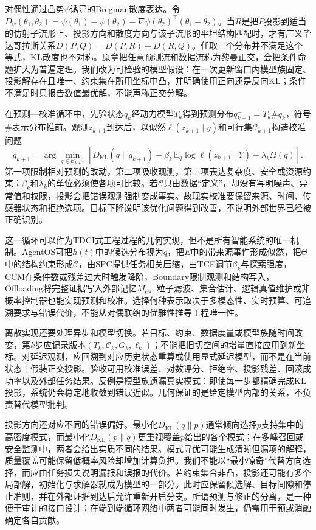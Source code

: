 对偶性通过凸势$\psi$诱导的Bregman散度表达。令$D_\psi(\theta_1,\theta_2)=\psi(\theta_1)-\psi(\theta_2)-\nabla\psi(\theta_2)^\top(\theta_1-\theta_2)$。当$R$是把$P$投影到适当的仿射子流形上、投影方向和散度方向与该子流形的平坦结构匹配时，才有广义毕达哥拉斯关系$D(P,Q)=D(P,R)+D(R,Q)$。任取三个分布并不满足这个等式，KL散度也不对称。原章把任意预测流和数据流称为黎曼正交，会把条件命题扩大为普遍定理。我们改为可检验的模型假设：在一次更新窗口内模型族固定、投影解存在且唯一、约束集在所用坐标中凸，并明确使用正向还是反向KL；条件不满足时只报告数值最优解，不能声称正交分解。

在预测—校准循环中，先验状态$q_k$经动力模型$T_k$得到预测分布$q^-_{k+1}=T_k\#q_k$，符号$\#$表示分布推前。观测$z_{k+1}$到达后，以似然$\ell(z_{k+1}\mid y)$和可行集$\mathcal C_{k+1}$构造校准问题
\begin{equation}
q_{k+1}=\arg\min_{q\in\mathcal C_{k+1}}
\left[D_{\mathrm{KL}}(q\|q^-_{k+1})-\beta_k\,\mathbb E_q\log \ell(z_{k+1}\mid Y)+\lambda_k\Omega(q)\right].
\label{eq:prediction_calibration_projection}
\end{equation}
第一项限制相对预测的改动，第二项吸收观测，第三项表达复杂度、安全或资源约束；$\beta_k$和$\lambda_k$的单位必须使各项可比较。若$\mathcal C$只由数据“定义”，却没有写明噪声、异常值和权限，投影会把错误观测强制变成事实。故现实校准要保留来源、时间、传感器状态和拒绝选项。目标下降说明该优化问题得到改善，不说明外部世界已经被正确识别。

这一循环可以作为TDCI式工程过程的几何实现，但不是所有智能系统的唯一机制。AgentOS可把$h(t)$中的候选分布视为$q$，把$E$中的带来源事件形成似然，把$\Theta$中的结构约束形成$\mathcal C$，由SPC提供任务相关压缩，由TCE调节$\beta_k$与探索强度，CCM在条件数或残差过大时触发降阶，Boundary限制观测和结构写入，Offloading将完整证据写入外部记忆$M_e$。粒子滤波、集合估计、逻辑真值维护或非概率控制器也能实现预测和校准。选择何种表示取决于多模态性、实时预算、可追溯要求与错误代价，不能从对偶联络的优雅性推导工程唯一性。

离散实现还要处理异步和模型切换。若目标、约束、数据度量或模型族随时间改变，第$k$步应记录版本$(T_k,\mathcal C_k,G_k,\ell_k)$；不能把旧切空间的增量直接应用到新坐标。对延迟观测，应回溯到对应历史状态重算或使用显式延迟模型，而不是在当前状态上假装正交投影。验收可用校准误差、对数评分、拒绝率、投影残差、回滚成功率以及外部任务结果。反例是模型族遗漏真实模式：即使每一步都精确完成KL投影，系统仍会稳定地收敛到错误近似。几何保证的是给定模型内部的关系，不负责替代模型批判。

投影方向还对应不同的错误偏好。最小化$D_{\mathrm{KL}}(q\|p)$通常倾向选择$p$支持集中的高密度模式，而最小化$D_{\mathrm{KL}}(p\|q)$更重视覆盖$p$给出的各个模式；在多峰召回或安全监测中，两者会给出实质不同的结果。模式寻优可能生成清晰但漏项的解释，质量覆盖可能保留低概率风险却增加计算负担。我们不能以“最小惊奇”代替方向选择，而应由任务损失说明漏报和误报的代价。若约束集合非凸，投影还可能有多个局部解，初始化与求解器就成为模型的一部分。此时应保留候选解、目标间隙和停止准则，并在外部证据到达后允许重新开启分支。所谓预测与修正的分离，是一种便于审计的接口设计；在端到端循环网络中两者可能同时发生，仍需用干预或消融确定各自贡献。

